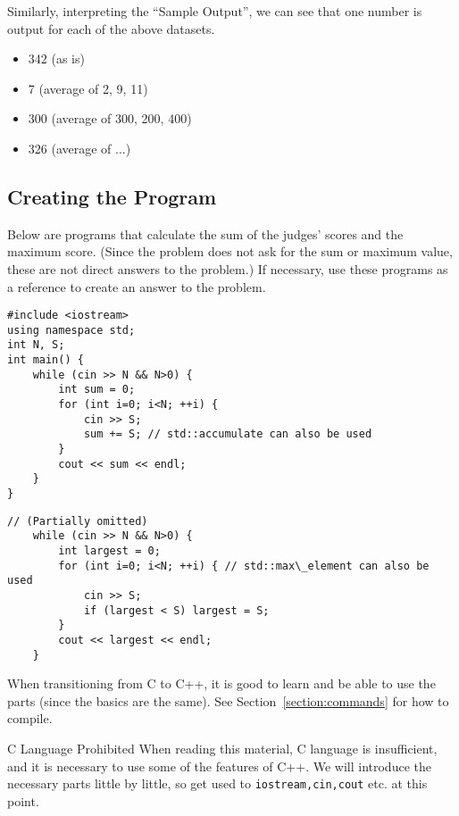 Similarly, interpreting the ``Sample Output'', we can see that one number is output for each of the above datasets.
\begin{itemize}
\item 342 (as is)
\item 7 (average of 2, 9, 11)
\item 300 (average of 300, 200, 400)
\item 326 (average of ...)
\end{itemize}
\subsection{Creating the Program}

Below are programs that calculate the sum of the judges' scores and the maximum score. (Since the problem does not ask for the sum or maximum value, these are not direct answers to the problem.) If necessary, use these programs as a reference to create an answer to the problem.

\begin{cbox}[emphstyle={[2]\graytext},emph={[2]iostream,using,namespace,std,cin,cout,endl}]
\begin{verbatim}
#include <iostream>
using namespace std;
int N, S;
int main() {
    while (cin >> N && N>0) {
        int sum = 0;
        for (int i=0; i<N; ++i) {
            cin >> S;
            sum += S; // std::accumulate can also be used
        }
        cout << sum << endl;
    }
}
\end{verbatim}
\end{cbox}

\begin{cbox}[emphstyle={[2]\graytext},emph={[2]iostream,using,namespace,std,cin,cout,endl}]
\begin{verbatim}
// (Partially omitted)
    while (cin >> N && N>0) {
        int largest = 0;
        for (int i=0; i<N; ++i) { // std::max\_element can also be used
            cin >> S;
            if (largest < S) largest = S;
        }
        cout << largest << endl;
    }
\end{verbatim}
\end{cbox}
When transitioning from C to C++, it is good to learn and be able to use the  parts (since the basics are the same). See Section~\ref{section:commands} for how to compile.

\begin{warningbox}{C Language Prohibited}
  When reading this material, C language is insufficient, and it is necessary to use some of the features of C++. We will introduce the necessary parts little by little, so get used to \texttt{iostream,cin,cout} etc. at this point.
\end{warningbox}

